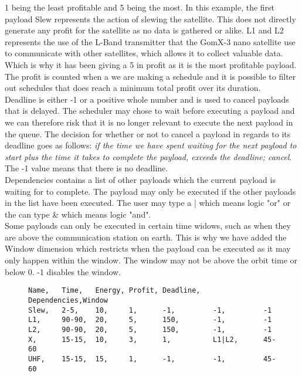 1 being the least profitable and 5 being the most.
In this example, the first payload Slew represents the action of slewing the satellite.
This does not directly generate any profit for the satellite as no data is gathered or alike.
L1 and L2 represents the use of the L-Band transmitter that the GomX-3 nano satellite use to communicate with other satellites, which allows it to collect valuable data.
Which is why it has been giving a 5 in profit as it is the most profitable payload.
The profit is counted when a we are making a schedule and it is possible to filter out schedules that does reach a minimum total profit over its duration.\\
Deadline is either -1 or a positive whole number and is used to cancel payloads that is delayed.
The scheduler may chose to wait before executing a payload and we can therefore risk that it is no longer relevant to execute the next payload in the queue.
The decision for whether or not to cancel a payload in regards to its deadline goes as follows: \textit{if the time we have spent waiting for the next payload to start plus the time it takes to complete the payload, exceeds the deadline; cancel}.\\
The -1 value means that there is no deadline.\\
Dependencies contains a list of other payloads which the current payload is waiting for to complete.
The payload may only be executed if the other payloads in the list have been executed.
The user may type a | which means logic "or" or the can type \& which means logic "and".\\
Some payloads can only be executed in certain time widows, such as when they are above the communication station on earth.
This is why we have added the Window dimension which restricts when the payload can be executed as it may only happen within the window.
The window may not be above the orbit time or below 0.
-1 disables the window.
\begin{figure}[H]
\begin{lstlisting}[caption={An example of how five payloads can be defined}, label=lst:csv, language=text]
Name,	Time,	Energy,	Profit,	Deadline,	Dependencies,Window
Slew,	2-5,	10,		1,		-1,			-1,			-1
L1,		90-90,	20,		5,		150,		-1,			-1
L2,		90-90,	20,		5,		150,		-1,			-1
X,		15-15,	10,		3,		1,			L1|L2,		45-60
UHF,	15-15,	15,		1,		-1,			-1,			45-60
\end{lstlisting}
\end{figure}

